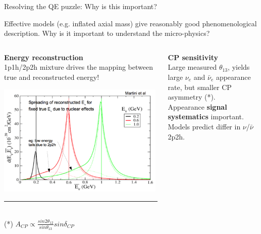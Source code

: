 %
%
%
\begin{frame}{Resolving the QE puzzle: Why is this important?}

{\small
  Effective models (e.g. inflated axial mass)
  give reasonably good phenomenological description.
  Why is it important to understand the micro-physics?\\
}

\vspace{0.1cm}

  \begin{columns}[T]
    \begin{column}{0.50\textwidth}
    {\scriptsize
      {\bf Energy reconstruction}\\
      1p1h/2p2h mixture drives the mapping between
      true and reconstructed energy!\\
      \begin{center}
        \includegraphics[width=0.99\textwidth]{./images/nuint/ccqe/ErecoQE_martini}
      \end{center}
      \noindent\rule{2cm}{0.4pt}\\
        (*) $A_{CP} \propto \frac{sin2\theta_{12}}{sin\theta_{13}} sin\delta_{CP}$
    }
    \end{column}
    \begin{column}{0.50\textwidth}
    {\scriptsize
     {\bf CP sensitivity}\\
     Large measured $\theta_{13}$, yields
     large $\nu_{e}$ and $\bar{\nu}_{e}$ appearance rate,
     but smaller CP asymmetry (*).\\
     Appearance {\bf signal systematics} important.\\
     Models predict differ in $\nu$/$\bar{\nu}$ 2p2h.\\
}
\end{column}
\end{columns}
\end{frame}
